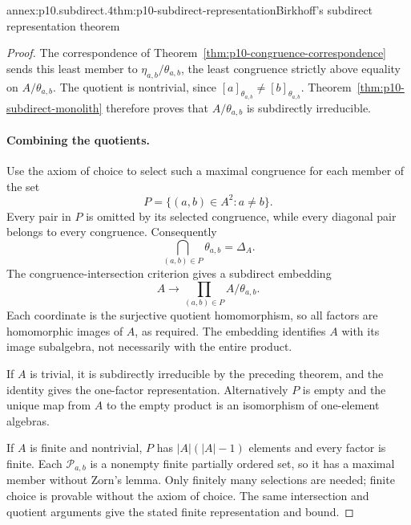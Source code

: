 \begin{annexitem}{annex:p10.subdirect.4}{thm:p10-subdirect-representation}{Birkhoff's subdirect representation theorem}
\begin{proof}
The correspondence of
Theorem~\ref{thm:p10-congruence-correspondence} sends this least
member to
\(\eta_{a,b}/\theta_{a,b}\), the least congruence strictly above
equality on \(A/\theta_{a,b}\).
The quotient is nontrivial, since \([a]_{\theta_{a,b}}\ne
[b]_{\theta_{a,b}}\).
Theorem~\ref{thm:p10-subdirect-monolith} therefore proves that
\(A/\theta_{a,b}\) is subdirectly irreducible.

\paragraph{Combining the quotients.}
Use the axiom of choice to select such a maximal congruence for
each member of the set
\[
 P=\{(a,b)\in A^2:a\ne b\}.
\]
Every pair in \(P\) is omitted by its selected congruence, while
every diagonal pair belongs to every congruence.  Consequently
\[
 \bigcap_{(a,b)\in P}\theta_{a,b}=\Delta_A.
\]
The congruence-intersection criterion gives a subdirect embedding
\[
 A\longrightarrow\prod_{(a,b)\in P}A/\theta_{a,b}.
\]
Each coordinate is the surjective quotient homomorphism, so all
factors are homomorphic images of \(A\), as required.
The embedding identifies \(A\) with its image subalgebra, not
necessarily with the entire product.

If \(A\) is trivial, it is subdirectly irreducible by the preceding
theorem, and the identity gives the one-factor representation.
Alternatively \(P\) is empty and the unique map from \(A\) to
the empty product is an isomorphism of one-element algebras.

If \(A\) is finite and nontrivial, \(P\) has
\(|A|(|A|-1)\) elements and every factor is finite.
Each \(\mathcal P_{a,b}\) is a nonempty finite partially ordered
set, so it has a maximal member without Zorn's lemma.
Only finitely many selections are needed; finite choice is
provable without the axiom of choice.
The same intersection and quotient arguments give the stated
finite representation and bound.
\end{proof}
\end{annexitem}
